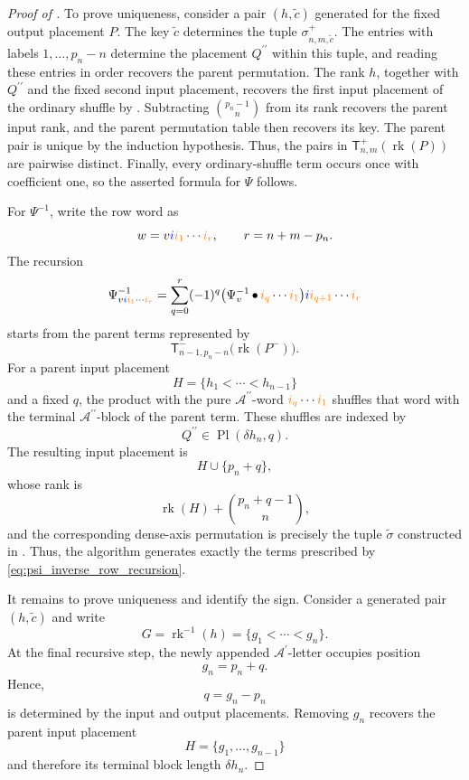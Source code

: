 \documentclass{amsart}
\theoremstyle{definition}
\theoremstyle{remark}
\newcommand{\gammashuffle}{{\,\bullet\,}}
\newcommand{\blue}[1]{{\color{blue}#1}}
\newcommand{\orange}[1]{{\color{orange}#1}}
\begin{document}
\begin{proof}[Proof of ]
To prove uniqueness, consider a pair
$(h,\widetilde{c})$ generated for the fixed output placement $P$. The key
$\widetilde{c}$ determines the tuple
$\sigma^{+}_{n,m,\widetilde{c}}$. The entries with labels
$1,\ldots,p_n-n$ determine the placement
$Q^{\prime\prime}$ within this tuple, and reading these entries in order
recovers the parent permutation. The rank $h$, together with
$Q^{\prime\prime}$ and the fixed second input placement, recovers the first
input placement of the ordinary shuffle by
. Subtracting
$\binom{p_n-1}{n}$ from its rank recovers the parent input rank, and the
parent permutation table then recovers its key. The parent pair is unique
by the induction hypothesis. Thus, the pairs in
$\mathsf{T}^{+}_{n,m}(\operatorname{rk}(P))$ are pairwise distinct.
Finally, every ordinary-shuffle term occurs once with coefficient one, so
the asserted formula for $\Psi$ follows.

For $\Psi^{-1}$, write the row word as
\[
    w
    =
    v\blue{i}
    \orange{i_1}\cdots\orange{i_r},
    \qquad
    r=n+m-p_n.
\]
The recursion
\[
    \Psi^{-1}_{v\blue{i}
        \orange{i_1}\cdots\orange{i_r}}
    =
    \sum_{q=0}^{r}
    (-1)^q
    \bigl(
        \Psi^{-1}_v
        \gammashuffle
        \orange{i_q}\cdots\orange{i_1}
    \bigr)
    \blue{i}
    \orange{i_{q+1}}\cdots\orange{i_r}
\]
starts from the parent terms represented by
\[
    \mathsf{T}^{-}_{n-1,p_n-n}
    \bigl(
        \operatorname{rk}(P^{-})
    \bigr).
\]
For a parent input placement
\[
    H=\{h_1<\cdots<h_{n-1}\}
\]
and a fixed $q$, the product with the pure
$\mathcal{A}^{\prime\prime}$-word
$\orange{i_q}\cdots\orange{i_1}$ shuffles that word with the terminal
$\mathcal{A}^{\prime\prime}$-block of the parent term. These shuffles are
indexed by
\[
    Q^{\prime\prime}
    \in
    \operatorname{Pl}(\delta h_n,q).
\]
The resulting input placement is
\[
    H\cup\{p_n+q\},
\]
whose rank is
\[
    \operatorname{rk}(H)
    +
    \binom{p_n+q-1}{n},
\]
and the corresponding dense-axis permutation is precisely the tuple
$\widetilde{\sigma}$ constructed in
. Thus, the algorithm generates exactly the
terms prescribed by \eqref{eq:psi_inverse_row_recursion}.

It remains to prove uniqueness and identify the sign. Consider a generated
pair $(h,\widetilde{c})$ and write
\[
    G
    =
    \operatorname{rk}^{-1}(h)
    =
    \{g_1<\cdots<g_n\}.
\]
At the final recursive step, the newly appended
$\mathcal{A}^{\prime}$-letter occupies position
\[
    g_n=p_n+q.
\]
Hence,
\[
    q=g_n-p_n
\]
is determined by the input and output placements. Removing $g_n$ recovers
the parent input placement
\[
    H=\{g_1,\ldots,g_{n-1}\}
\]
and therefore its terminal block length $\delta h_n$.


\end{proof}
\end{document}
